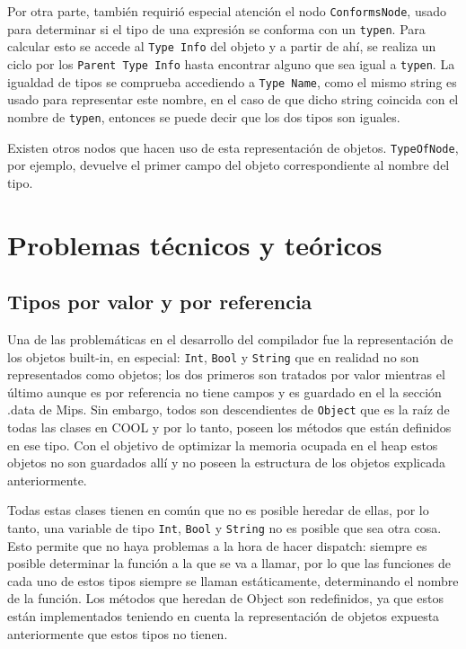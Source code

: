 \documentclass[11pt]{scrartcl} %
\begin{document}
Por otra parte, también requirió especial atención el nodo \texttt{ConformsNode}, usado para determinar si el tipo de una expresión se conforma con un \texttt{typen}. Para calcular esto se accede al \texttt{Type Info} del objeto y a partir de ahí, se realiza un ciclo por los \texttt{Parent Type Info} hasta encontrar alguno que sea igual a \texttt{typen}. La igualdad de tipos se comprueba accediendo a \texttt{Type Name}, como el mismo string es usado para representar este nombre, en el caso de que dicho string coincida con el nombre de \texttt{typen}, entonces se puede decir que los dos tipos son iguales.

Existen otros nodos que hacen uso de esta representación de objetos. \texttt{TypeOfNode}, por ejemplo, devuelve el primer campo del objeto correspondiente al nombre del tipo.


\section{Problemas técnicos y teóricos}

\subsection{Tipos por valor y por referencia}

Una de las problemáticas en el desarrollo del compilador fue la representación de los objetos built-in, en especial: \texttt{Int}, \texttt{Bool} y \texttt{String} que en realidad no son representados como objetos; los dos primeros son tratados por valor mientras el último aunque es por referencia no tiene campos y es guardado en el la sección .data de Mips. Sin embargo, todos son descendientes de \texttt{Object} que es la raíz de todas las clases en COOL y por lo tanto, poseen los métodos que están definidos en ese tipo. Con el objetivo de optimizar la memoria ocupada en el heap estos objetos no son guardados allí y no poseen la estructura de los objetos explicada anteriormente.

Todas estas clases tienen en común que no es posible heredar de ellas, por lo tanto, una variable de tipo \texttt{Int}, \texttt{Bool} y \texttt{String} no es posible que sea otra cosa. Esto permite que no haya problemas a la hora de hacer dispatch: siempre es posible determinar la función a la que se va a llamar, por lo que las funciones de cada uno de estos tipos siempre se llaman estáticamente, determinando el nombre de la función. Los métodos que heredan de Object son redefinidos, ya que estos están implementados teniendo en cuenta la representación de objetos expuesta anteriormente que estos tipos no tienen.
\end{document}
